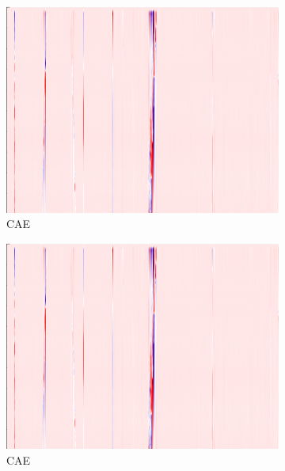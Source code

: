 \begin{figure}[h]
    \begin{subfigure}{0.33\textwidth}
        \includegraphics[width=\textwidth]{figures/test.png}
        \caption{CAE}
    \end{subfigure}%
    \hfill
    \begin{subfigure}{0.33\textwidth}
        \includegraphics[width=\textwidth]{figures/test.png}
        \caption{CAE}
    \end{subfigure}%
    \hfill
    \begin{subfigure}{0.33\textwidth}

\end{subfigure}
\end{figure}
